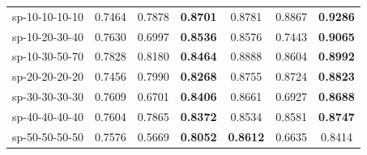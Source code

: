 \begin{table}[!t]
\begin{tabular}{lcccccc}
    sp-10-10-10-10 & 0.7464 & 0.7878 & \textbf{0.8701} & 0.8781 & 0.8867 & \textbf{0.9286} \\
    sp-10-20-30-40                 & 0.7630                           & 0.6997                           & \textbf{0.8536} & 0.8576                           & 0.7443                           & \textbf{0.9065} \\
    sp-10-30-50-70  & 0.7828 & 0.8180 & \textbf{0.8464} & 0.8888 & 0.8604 & \textbf{0.8992} \\
    sp-20-20-20-20 & 0.7456 & 0.7990 & \textbf{0.8268} & 0.8755 & 0.8724 & \textbf{0.8823} \\
    sp-30-30-30-30 & 0.7609 & 0.6701 & \textbf{0.8406} & 0.8661 & 0.6927 & \textbf{0.8688} \\
    sp-40-40-40-40 & 0.7604 & 0.7865 & \textbf{0.8372} & 0.8534 & 0.8581 & \textbf{0.8747} \\
    sp-50-50-50-50 & 0.7576 & 0.5669 & \textbf{0.8052} & \textbf{0.8612} & 0.6635 & 0.8414 \\
    \hline
    \end{tabular}%
        
\end{table}

